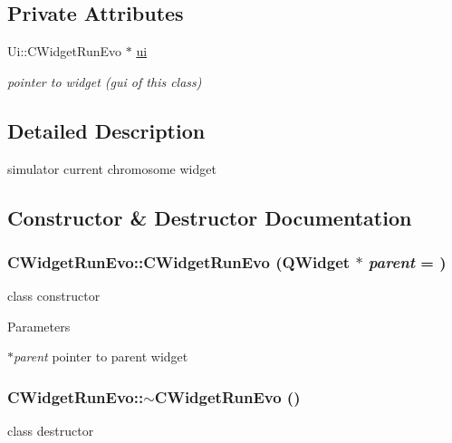 \subsection*{Private Attributes}
\begin{DoxyCompactItemize}
\item 
\hypertarget{classCWidgetRunEvo_a06071f35be1d1449b92f3f955077de7d}{
Ui::CWidgetRunEvo $\ast$ \hyperlink{classCWidgetRunEvo_a06071f35be1d1449b92f3f955077de7d}{ui}}
\label{classCWidgetRunEvo_a06071f35be1d1449b92f3f955077de7d}

\begin{DoxyCompactList}\small\item\em pointer to widget (gui of this class) \item\end{DoxyCompactList}\end{DoxyCompactItemize}


\subsection{Detailed Description}
simulator current chromosome widget 

\subsection{Constructor \& Destructor Documentation}
\hypertarget{classCWidgetRunEvo_aae34e6942f7140d3f2d09da22c676cfa}{
\subsubsection[{CWidgetRunEvo}]{\setlength{\rightskip}{0pt plus 5cm}CWidgetRunEvo::CWidgetRunEvo (QWidget $\ast$ {\em parent} = {})}}
\label{classCWidgetRunEvo_aae34e6942f7140d3f2d09da22c676cfa}
class constructor


\begin{DoxyParams}{Parameters}
\item[{\em $\ast$parent}]pointer to parent widget \end{DoxyParams}
\hypertarget{classCWidgetRunEvo_a4ffbe6072c867efccd2f86b56025ff81}{
\subsubsection[{$\sim$CWidgetRunEvo}]{\setlength{\rightskip}{0pt plus 5cm}CWidgetRunEvo::$\sim$CWidgetRunEvo ()}}
\label{classCWidgetRunEvo_a4ffbe6072c867efccd2f86b56025ff81}
class destructor 

